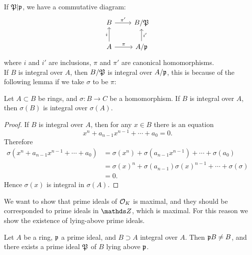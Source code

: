 			If $\mathfrak{P}|\mathfrak{p}$, we have a commutative diagram:
			\[
				\begin{tikzcd}
					B \arrow[r, "\pi'"]               & B/\mathfrak{P}                  \\
					A \arrow[r, "\pi"] \arrow[u, "i"] & A/\mathfrak{p} \arrow[u, "i'"']
				\end{tikzcd}
			\]
			where $i$ and $i'$ are inclusions, $\pi$ and $\pi'$ are canonical homomorphisms. \\
			If $B$ is integral over $A$, then $B/\mathfrak{P}$ is integral over $A/\mathfrak{p}$, this is because of the following lemma if we take $\sigma$ to be $\pi$:
			\begin{lemma}
				Let $A \subset B$ be rings, and $\sigma:B \to C$ be a homomorphism. If $B$ is integral over $A$, then $\sigma(B)$ is integral over $\sigma(A)$.
			\end{lemma}
			\begin{proof}
				If $B$ is integral over $A$, then for any $x \in B$ there is an equation
				\[
					x^n + a_{n-1}x^{n-1}+\cdots+a_0 = 0.
				\]
				Therefore
				\[
					\begin{aligned}
						\sigma(x^n+a_{n-1}x^{n-1}+\cdots+a_0) &= \sigma(x^n)+\sigma(a_{n-1}x^{n-1})+\cdots+\sigma(a_0) \\
															  &= \sigma(x)^n + \sigma(a_{n-1})\sigma(x)^{n-1}+\cdots+\sigma(\sigma) \\
															  &= 0.
					\end{aligned}
				\]
				Hence $\sigma(x)$ is integral in $\sigma(A)$.
			\end{proof}
			
			We want to show that prime ideals of $\mathcal{O}_K$ is maximal, and they should be corresponded to prime ideals in $\Z$, which is maximal. For this reason we show the existence of lying-above prime ideals.
			
			\begin{theorem}\label{lying-above}
				Let $A$ be a ring, $\mathfrak{p}$ a prime ideal, and $B \supset A$ integral over $A$. Then $\mathfrak{p}B \ne B$, and there exists a prime ideal $\mathfrak{P}$ of $B$ lying above $\mathfrak{p}$. 
			\end{theorem}
		
